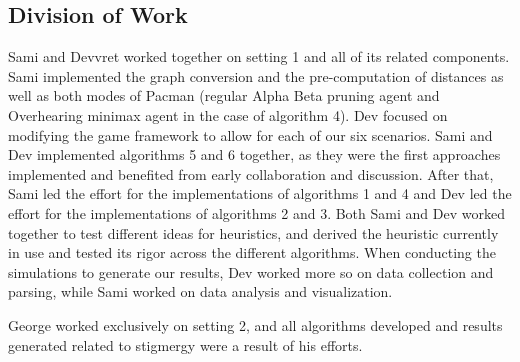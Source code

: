 \documentclass[11pt]{article}
\begin{document}
\begin{multicols}{2}
\section{Division of Work}
Sami and Devvret worked together on setting 1 and all of its related components. Sami implemented the graph conversion and the pre-computation of distances as well as both modes of Pacman (regular Alpha Beta pruning agent and Overhearing minimax agent in the case of algorithm 4). Dev focused on modifying the game framework to allow for each of our six scenarios. Sami and Dev implemented algorithms 5 and 6 together, as they were the first approaches implemented and benefited from early collaboration and discussion. After that, Sami led the effort for the implementations of algorithms 1 and 4 and Dev led the effort for the implementations of algorithms 2 and 3. Both Sami and Dev worked together to test different ideas for heuristics, and derived the heuristic currently in use and tested its rigor across the different algorithms. When conducting the simulations to generate our results, Dev worked more so on data collection and parsing, while Sami worked on data analysis and visualization.  

George worked exclusively on setting 2, and all algorithms developed and results generated related to stigmergy were a result of his efforts.




\vspace*{9 in}
\vspace*{1 in}



\end{multicols}
\end{document}
